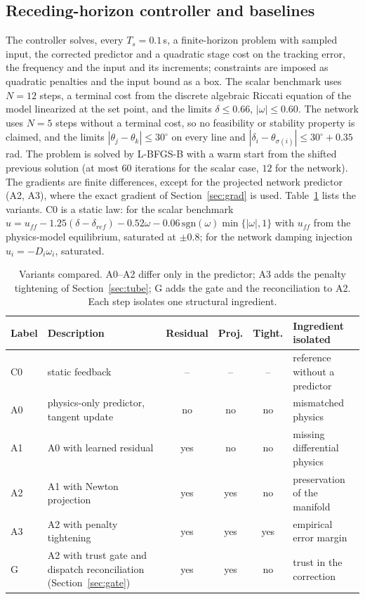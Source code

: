 \documentclass[preprint,12pt]{elsarticle}
\begin{document}
\subsection{Receding-horizon controller and baselines}
\label{sec:mpc}
The controller solves, every $T_s=0.1$\,s, a finite-horizon problem with sampled input, the corrected predictor and a quadratic stage cost on the tracking error, the frequency and the input and its increments; constraints are imposed as quadratic penalties and the input bound as a box. The scalar benchmark uses $N=12$ steps, a terminal cost from the discrete algebraic Riccati equation of the model linearized at the set point, and the limits $\delta\le 0.66$, $|\omega|\le 0.60$. The network uses $N=5$ steps without a terminal cost, so no feasibility or stability property is claimed, and the limits $|\theta_j-\theta_k|\le 30^\circ$ on every line and $|\delta_i-\theta_{\sigma(i)}|\le 30^\circ+0.35$\,rad. The problem is solved by \mbox{L-BFGS-B} with a warm start from the shifted previous solution (at most $60$ iterations for the scalar case, $12$ for the network). The gradients are finite differences, except for the projected network predictor (A2, A3), where the exact gradient of Section~\ref{sec:grad} is used. Table~\ref{tab:variants} lists the variants. C0 is a static law: for the scalar benchmark $u=u_{ff}-1.25(\delta-\delta_{ref})-0.52\omega-0.06\,\mathrm{sgn}(\omega)\min\{|\omega|,1\}$ with $u_{ff}$ from the physics-model equilibrium, saturated at $\pm0.8$; for the network damping injection $u_i=-D_i\omega_i$, saturated.

\begin{table}[!t]
\centering\small
\caption{Variants compared. A0--A2 differ only in the predictor; A3 adds the penalty tightening of Section~\ref{sec:tube}; G adds the gate and the reconciliation to A2. Each step isolates one structural ingredient.}
\label{tab:variants}
\begin{tabular}{l>{\raggedright\arraybackslash}p{3.3cm}ccc>{\raggedright\arraybackslash}p{3.3cm}}
\toprule
Label & Description & Residual & Proj. & Tight. & Ingredient isolated\\
\midrule
C0 & static feedback & -- & -- & -- & reference without a predictor\\
A0 & physics-only predictor, tangent update & no & no & no & mismatched physics\\
A1 & A0 with learned residual & yes & no & no & missing differential physics\\
A2 & A1 with Newton projection & yes & yes & no & preservation of the manifold\\
A3 & A2 with penalty tightening & yes & yes & yes & empirical error margin\\
G & A2 with trust gate and dispatch reconciliation (Section~\ref{sec:gate}) & yes & yes & no & trust in the correction\\
\bottomrule
\end{tabular}
\end{table}
\end{document}
